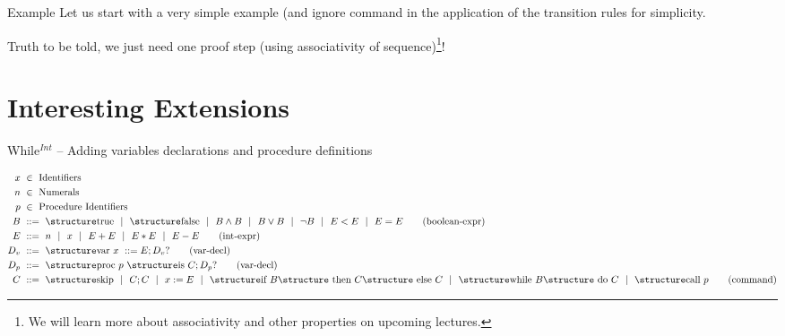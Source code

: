 \documentclass[aspectratio=169]{beamer}
\begin{document}
\begin{slide}{Example}
Let us start with a very simple example (and ignore  command in the application of the transition rules for simplicity.
\begin{prooftree}
\end{prooftree}
Truth to be told, we just need one proof step (using associativity of sequence)\footnote{We will learn more about associativity and other properties on upcoming lectures.}!
\begin{prooftree}
\end{prooftree}
\end{slide}

\section{Interesting Extensions}


\begin{slide}{While$^{Int}$ -- Adding variables declarations and procedure definitions}
\small

\begin{align*}
  x &~\in~ \text{Identifiers}
  \\
  n &~\in~ \text{Numerals}
  \\
  p &~\in~ \text{Procedure Identifiers}
  \\
  B &~::=~ \kw{true} ~~|~~ \kw{false}  ~~|~~ B \land B ~~|~~ B \lor B ~~|~~ \lnot B ~~|~~ E<E ~~|~~ E=E
  \tag{boolean-expr}\\
  E &~::=~ n ~~|~~ x ~~|~~ E+E ~~|~~ E*E ~~|~~ E-E
  \tag{int-expr}\\
  D_v &~::=~ \kw{var}~x~::=E; D_v? 
  \tag{var-decl}\\
  D_p &~::=~ \kw{proc}~ p~ \kw{is}~ C; D_p? 
  \tag{var-decl}\\
  C &~::=~ \kw {skip} ~~|~~ C;C ~~|~~ x:=E ~~|~~  \kw{if } B \kw{ then } C\kw{ else }C ~~|~~  \kw{while }B\kw{ do }C ~~|~~\kw{call}~p
  \tag{command}
\end{align*}

\end{slide}
\end{document}
